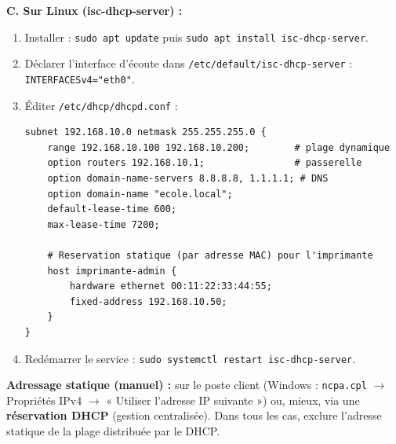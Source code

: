 \documentclass[11pt]{article}
\begin{document}
\begin{methode}
\textbf{C. Sur Linux (isc-dhcp-server) :}
\begin{enumerate}
    \item Installer : \texttt{sudo apt update} puis \texttt{sudo apt install isc-dhcp-server}.
    \item Déclarer l'interface d'écoute dans \texttt{/etc/default/isc-dhcp-server} : \texttt{INTERFACESv4="eth0"}.
    \item Éditer \texttt{/etc/dhcp/dhcpd.conf} :
\begin{lstlisting}
subnet 192.168.10.0 netmask 255.255.255.0 {
    range 192.168.10.100 192.168.10.200;        # plage dynamique
    option routers 192.168.10.1;                # passerelle
    option domain-name-servers 8.8.8.8, 1.1.1.1; # DNS
    option domain-name "ecole.local";
    default-lease-time 600;
    max-lease-time 7200;

    # Reservation statique (par adresse MAC) pour l'imprimante
    host imprimante-admin {
        hardware ethernet 00:11:22:33:44:55;
        fixed-address 192.168.10.50;
    }
}
\end{lstlisting}
    \item Redémarrer le service : \texttt{sudo systemctl restart isc-dhcp-server}.
\end{enumerate}
\textbf{Adressage statique (manuel) :} sur le poste client (Windows : \texttt{ncpa.cpl} $\rightarrow$ Propriétés IPv4 $\rightarrow$ « Utiliser l'adresse IP suivante ») ou, mieux, via une \textbf{réservation DHCP} (gestion centralisée). Dans tous les cas, exclure l'adresse statique de la plage distribuée par le DHCP.
\end{methode}
\end{document}
